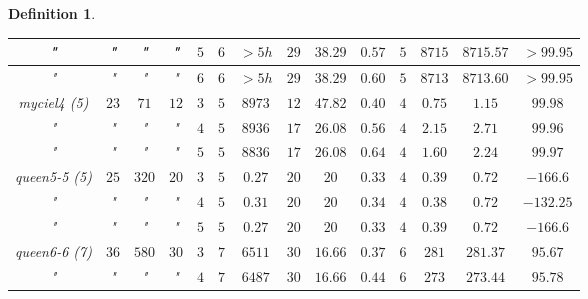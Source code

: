\documentclass[12pt]{article}
\theoremstyle{slplain}
\newtheorem{defi}{Definition}[section]
\begin{document}
\begin{defi}
\begin{table}[H]
\begin{center}
\begin{tabular}{|c|c|c|c|c|c|c|c|c|c|c|c|c|c|}
\hline
{\small "} & {\small "} & {\small "} & {\small "} & {\small $5$} & {\small $6$} & {\small $>5h$} & {\small $29$}  & {\small $38.29$} & {\small $0.57$}  & {\small $5$} & {\small $8715$} & {\small $8715.57$}  & {\small $>99.95$}\\
\hline
{\small "} & {\small "} & {\small "} & {\small "} & {\small $6$} & {\small $6$} & {\small $>5h$} & {\small $29$}  & {\small $38.29$} & {\small $0.60$} & {\small $5$} & {\small $8713$} & {\small $8713.60$}  & {\small $>99.95$}\\
\hline
\hline
{\small myciel4 (5)} & {\small $23$} & {\small $71$} & {\small $12$} & {\small $3$} & {\small $5$} & {\small $8973$} & {\small $12$}  & {\small $47.82$} & {\small $0.40$} & {\small $4$} & {\small $0.75$} & {\small $1.15$}  & {\small $99.98$}\\
\hline
{\small "} & {\small "} & {\small "} & {\small "} & {\small $4$} & {\small $5$} & {\small $8936$} & {\small $17$}  & {\small $26.08$} & {\small $0.56$} & {\small $4$} & {\small $2.15$} & {\small $2.71$}  & {\small $99.96$}\\
\hline
{\small "} & {\small "} & {\small "} & {\small "} & {\small $5$} & {\small $5$} & {\small $8836$} & {\small $17$}  & {\small $26.08$} & {\small $0.64$} & {\small $4$} & {\small $1.60$} & {\small $2.24$}  & {\small $99.97$}\\
\hline
\hline
{\small queen5-5 (5)} & {\small $25$} & {\small $320$} & {\small $20$} & {\small $3$} & {\small $5$} & {\small $0.27$} & {\small $20$}  & {\small $20$} & {\small $0.33$} & {\small $4$} & {\small $0.39$} & {\small $0.72$}  & {\small $-166.6$}\\
\hline
{\small "} & {\small "} & {\small "} & {\small "} & {\small $4$} & {\small $5$} & {\small $0.31$} & {\small $20$}  & {\small $20$} & {\small $0.34$} & {\small $4$} & {\small $0.38$} & {\small $0.72$}  & {\small $-132.25$}\\
\hline
{\small "} & {\small "} & {\small "} & {\small "} & {\small $5$} & {\small $5$} & {\small $0.27$} & {\small $20$}  & {\small $20$} & {\small $0.33$} & {\small $4$} & {\small $0.39$} & {\small $0.72$}  & {\small $-166.6$}\\
\hline
\hline
{\small queen6-6 (7)} & {\small $36$} & {\small $580$} & {\small $30$} & {\small $3$} & {\small $7$} & {\small $6511$} & {\small $30$}  & {\small $16.66$} & {\small $0.37$} & {\small $6$} & {\small $281$} & {\small $281.37$} & {\small $95.67$}\\
\hline
{\small "} & {\small "} & {\small "} & {\small "} & {\small $4$} & {\small $7$} & {\small $6487$} & {\small $30$}  & {\small $16.66$} & {\small $0.44$} & {\small $6$} & {\small $273$} & {\small $273.44$} & {\small $95.78$}\\

\end{tabular}
\end{center}
\end{table}
\end{defi}
\end{document}
